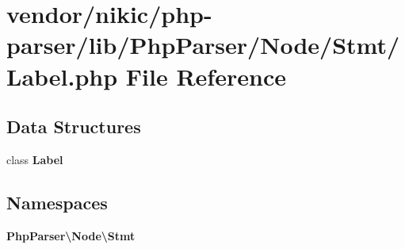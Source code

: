 \section{vendor/nikic/php-\/parser/lib/\+Php\+Parser/\+Node/\+Stmt/\+Label.php File Reference}
\label{_label_8php}
\subsection*{Data Structures}
\begin{DoxyCompactItemize}
\item 
class {\bf Label}
\end{DoxyCompactItemize}
\subsection*{Namespaces}
\begin{DoxyCompactItemize}
\item 
 {\bf Php\+Parser\textbackslash{}\+Node\textbackslash{}\+Stmt}
\end{DoxyCompactItemize}
